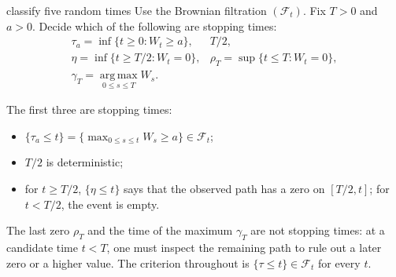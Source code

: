 \documentclass[10pt]{article}
\newcommand{\1}{\mathbf 1}
\newcommand{\cF}{\mathcal F}
\theoremstyle{definition}
\begin{document}
\begin{studentexercise}{classify five random times}
Use the Brownian filtration \((\cF_t)\). Fix \(T>0\) and \(a>0\). Decide
which of the following are stopping times:
\[
\begin{array}{ll}
\tau_a=\inf\{t\geq0:W_t\geq a\}, & T/2,\\[0.3em]
\eta=\inf\{t\geq T/2:W_t=0\}, &
\rho_T=\sup\{t\leq T:W_t=0\},\\[0.3em]
\gamma_T=\operatorname*{arg\,max}_{0\leq s\leq T}W_s.&
\end{array}
\]
\end{studentexercise}
\begin{shortsolution}
The first three are stopping times:
\begin{itemize}
  \item \(\{\tau_a\leq t\}
  =\{\max_{0\leq s\leq t}W_s\geq a\}\in\cF_t\);
  \item \(T/2\) is deterministic;
  \item for \(t\geq T/2\), \(\{\eta\leq t\}\) says that the observed path
        has a zero on \([T/2,t]\); for \(t<T/2\), the event is empty.
\end{itemize}
The last zero \(\rho_T\) and the time of the maximum \(\gamma_T\) are not
stopping times: at a candidate time \(t<T\), one must inspect the remaining
path to rule out a later zero or a higher value. The criterion throughout is
\(\{\tau\leq t\}\in\cF_t\) for every \(t\).
\end{shortsolution}
\end{document}
